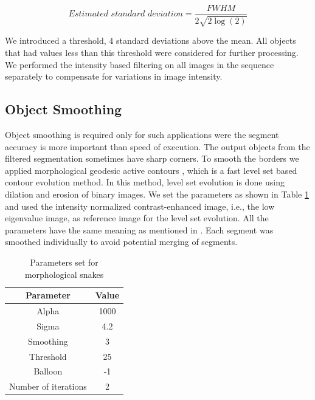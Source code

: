 \documentclass[journal]{IEEEtran}
\begin{document}
\begin{equation}
\textit{Estimated standard deviation} = \frac{FWHM}{2 \sqrt{2\log(2)}}
\end{equation}

We introduced a threshold, $4$ standard deviations above the mean. All objects that had values less than this threshold were considered for further processing. We performed the intensity based filtering on all images in the sequence separately to compensate for variations in image intensity.

\subsection{Object Smoothing}

Object smoothing is required only for such applications were the segment accuracy is more important than speed of execution. The output objects from the filtered segmentation sometimes have sharp corners. To smooth the borders we applied morphological geodesic active contours \cite {marquezmorphological2014}, which is a fast level set based contour evolution method. In this method, level set evolution is done using dilation and erosion of binary images. We set the parameters as shown in Table \ref{tab:paramsnake} and used the intensity normalized contrast-enhanced image, i.e., the low eigenvalue image, as reference image for the level set evolution. All the parameters have the same meaning as mentioned in \cite {marquezmorphological2014}.  Each segment was smoothed individually to avoid potential merging of segments. 
\begin{table}[t]

	\caption{Parameters set for morphological snakes}
	\label{tab:paramsnake}
	\centering
	
	\begin{tabular}{c c }
	\hline
	\hline
	Parameter & Value \\
	\hline
	Alpha & 1000\\
	Sigma & 4.2 \\
	Smoothing & 3 \\
	Threshold & 25\\
	Balloon & -1 \\
	Number of iterations & 2\\
	\hline
	\hline
	\end{tabular}

\end{table}
\end{document}
